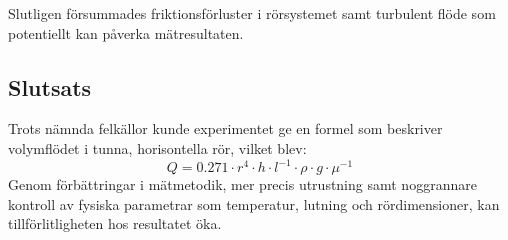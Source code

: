 \documentclass[a4paper,12pt]{article}
\begin{document}
Slutligen försummades friktionsförluster i rörsystemet samt turbulent flöde som potentiellt kan påverka mätresultaten.
\subsection{Slutsats}
Trots nämnda felkällor kunde experimentet ge en formel som beskriver volymflödet i tunna, horisontella rör, vilket blev:
\[
Q = 0.271 \cdot r^4 \cdot h \cdot l^{-1} \cdot \rho \cdot g \cdot \mu^{-1}
\]
Genom förbättringar i mätmetodik, mer precis utrustning samt noggrannare kontroll av fysiska parametrar som temperatur, lutning och rördimensioner, kan tillförlitligheten hos resultatet öka. 
\end{document}
